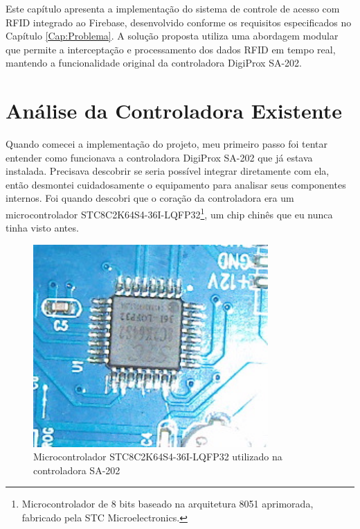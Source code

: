 
\label{Cap:Implementacao}

Este capítulo apresenta a implementação do sistema de controle de acesso com RFID integrado ao Firebase, desenvolvido conforme os requisitos especificados no Capítulo \ref{Cap:Problema}. A solução proposta utiliza uma abordagem modular que permite a interceptação e processamento dos dados RFID em tempo real, mantendo a funcionalidade original da controladora DigiProx SA-202.

\section{Análise da Controladora Existente}
\label{sec:analise-controladora}

Quando comecei a implementação do projeto, meu primeiro passo foi tentar entender como funcionava a controladora DigiProx SA-202 que já estava instalada. Precisava descobrir se seria possível integrar diretamente com ela, então desmontei cuidadosamente o equipamento para analisar seus componentes internos. Foi quando descobri que o coração da controladora era um microcontrolador STC8C2K64S4-36I-LQFP32\footnote{Microcontrolador de 8 bits baseado na arquitetura 8051 aprimorada, fabricado pela STC Microelectronics.}, um chip chinês que eu nunca tinha visto antes.

\begin{figure}[htbp!]
\centering
\includegraphics[width=0.8\textwidth]{pre-textuais/figuras/MicrontroladorSa202.JPG}
\caption{Microcontrolador STC8C2K64S4-36I-LQFP32 utilizado na controladora SA-202}
\label{fig:microcontrolador_sa202}
\end{figure}

